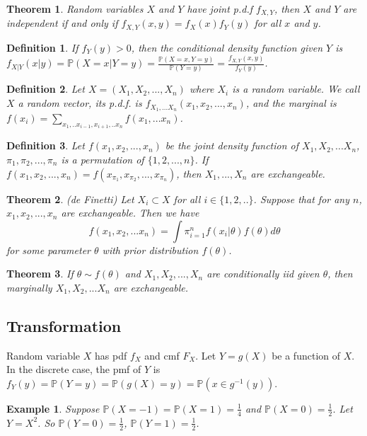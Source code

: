 \documentclass[11pt]{article}
\def\BP{{\bf P}}
\def\BP{{\mathbb P}}
\newtheorem{theorem}{Theorem}[section]
\newtheorem{definition}{Definition}[section]
\newtheorem{example}{Example}[section]
\begin{document}
\begin{theorem}
Random variables $X$ and $Y$ have joint p.d.f $f_{X,Y}$, then $X$ and $Y$ are independent if and only if $f_{X,Y}(x,y) = f_X(x) f_Y(y)$ for all $x$ and $y$.
\end{theorem}

\begin{definition}
If $f_Y(y) > 0$, then the conditional density function given $Y$ is $f_{X|Y}(x | y) = \BP(X = x| Y = y) = \frac{\BP(X=x, Y= y)}{\BP(Y= y)} = \frac{f_{X,Y}(x, y)}{f_Y(y)}$.
\end{definition}

\begin{definition}
Let $X = (X_1, X_2, ..., X_n)$ where $X_i$ is a random variable. We call $X$ a random vector, its p.d.f. is $f_{X_1, ... X_n}(x_1, x_2, ..., x_n)$, and the marginal is $f(x_i)= \sum_{x_1, .. x_{i-1}, x_{i+1}, ..x_n} f(x_1, ... x_n)$.
\end{definition}

\begin{definition}
Let $f(x_1, x_2, ..., x_n)$ be the joint density function of $X_1, X_2, ... X_n$, $\pi_1, \pi_2, ..., \pi_n$ is a permutation of $\{1, 2, ..., n\}$. If $f(x_1, x_2, ..., x_n) = f(x_{\pi_1}, x_{\pi_2}, ..., x_{\pi_n})$, then $X_1, ..., X_n$ are exchangeable.
\end{definition}

\begin{theorem}(de Finetti)
Let $X_i \subset X$ for all $i\in\{1, 2, ..\}$. Suppose that for any $n$, $x_1, x_2, ..., x_n$ are exchangeable. Then we have \[f(x_1, x_2, ... x_n) = \int \pi_{i=1}^n f(x_i | \theta) f(\theta) d\theta\] for some parameter $\theta$ with prior distribution $f(\theta)$.
\end{theorem}

\begin{theorem}
If $\theta \sim f(\theta)$ and $X_1, X_2, ..., X_n$ are conditionally iid given $\theta$, then marginally $X_1, X_2, ... X_n$ are exchangeable.
\end{theorem}

\subsection{Transformation}
Random variable $X$ has pdf $f_X$ and cmf $F_X$. Let $Y = g(X)$ be a function of $X$. In the discrete case, the pmf of $Y$ is $f_Y(y) = \BP(Y = y) = \BP(g(X) = y) = \BP(x \in g^{-1}(y))$.

\begin{example}
Suppose $\BP(X=-1) = \BP(X=1) = \frac{1}{4}$ and $\BP(X=0) = \frac{1}{2}$. Let $Y=X^2$. So $\BP(Y=0) = \frac{1}{2}$, $\BP(Y=1)=\frac{1}{2}$.
\end{example}
\end{document}
